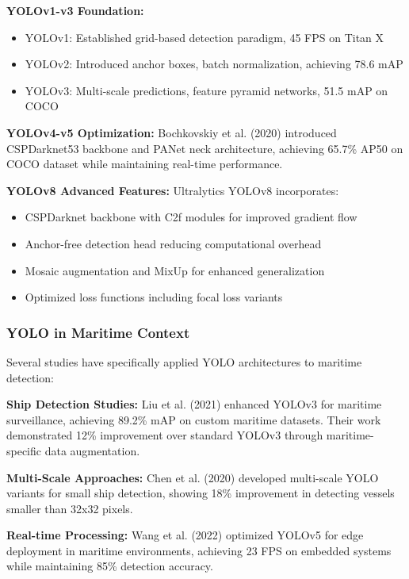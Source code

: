 \documentclass[twoside]{article}
\begin{document}
\begin{multicols}{2}
\textbf{YOLOv1-v3 Foundation:} 
\begin{itemize}
    \item YOLOv1: Established grid-based detection paradigm, 45 FPS on Titan X
    \item YOLOv2: Introduced anchor boxes, batch normalization, achieving 78.6 mAP
    \item YOLOv3: Multi-scale predictions, feature pyramid networks, 51.5 mAP on COCO
\end{itemize}

\textbf{YOLOv4-v5 Optimization:}
Bochkovskiy et al. (2020) \cite{bochkovskiy2020yolov4} introduced CSPDarknet53 backbone and PANet neck architecture, achieving 65.7\% AP50 on COCO dataset while maintaining real-time performance.

\textbf{YOLOv8 Advanced Features:}
Ultralytics YOLOv8 \cite{yolov8} incorporates:
\begin{itemize}
    \item CSPDarknet backbone with C2f modules for improved gradient flow
    \item Anchor-free detection head reducing computational overhead
    \item Mosaic augmentation and MixUp for enhanced generalization
    \item Optimized loss functions including focal loss variants
\end{itemize}

\subsubsection{YOLO in Maritime Context}
Several studies have specifically applied YOLO architectures to maritime detection:

\textbf{Ship Detection Studies:} Liu et al. (2021) \cite{liu2021enhanced} enhanced YOLOv3 for maritime surveillance, achieving 89.2\% mAP on custom maritime datasets. Their work demonstrated 12\% improvement over standard YOLOv3 through maritime-specific data augmentation.

\textbf{Multi-Scale Approaches:} Chen et al. (2020) \cite{chen2020improved} developed multi-scale YOLO variants for small ship detection, showing 18\% improvement in detecting vessels smaller than 32x32 pixels.

\textbf{Real-time Processing:} Wang et al. (2022) \cite{wang2022realtime} optimized YOLOv5 for edge deployment in maritime environments, achieving 23 FPS on embedded systems while maintaining 85\% detection accuracy.


\end{multicols}
\end{document}
